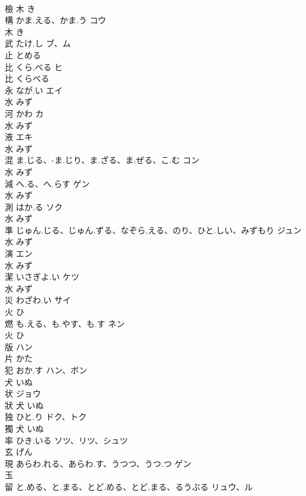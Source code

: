\documentclass[8pt]{extreport}
\begin{document}
\begin{CJK}{UTF8}{min}
\\	檢	木		き		
\\	構	かま.える、かま.う	コウ	
\\	木		き		
\\	武	たけ.し	ブ、ム	
\\	止		とめる		
\\	比	くら.べる	ヒ	
\\	比		くらべる		
\\	永	なが.い	エイ	
\\	水		みず		
\\	河	かわ	カ	
\\	水		みず		
\\	液		エキ	
\\	水		みず		
\\	混	ま.じる、-ま.じり、ま.ざる、ま.ぜる、こ.む	コン	
\\	水		みず		
\\	減	へ.る、へ.らす	ゲン	
\\	水		みず		
\\	測	はか.る	ソク	
\\	水		みず		
\\	準	じゅん.じる、じゅん.ずる、なぞら.える、のり、ひと.しい、みずもり	ジュン	
\\	水		みず		
\\	演		エン	
\\	水		みず		
\\	潔	いさぎよ.い	ケツ	
\\	水		みず		
\\	災	わざわ.い	サイ	
\\	火		ひ		
\\	燃	も.える、も.やす、も.す	ネン	
\\	火		ひ		
\\	版		ハン	
\\	片		かた		
\\	犯	おか.す	ハン、ボン	
\\	犬		いぬ		
\\	状		ジョウ	
\\	狀	犬		いぬ		
\\	独	ひと.り	ドク、トク	
\\	獨	犬		いぬ		
\\	率	ひき.いる	ソツ、リツ、シュツ	
\\	玄		げん		
\\	現	あらわ.れる、あらわ.す、うつつ、うつ.つ	ゲン	
\\	玉				
\\	留	と.める、と.まる、とど.める、とど.まる、るうぶる	リュウ、ル	

\end{CJK}
\end{document}
